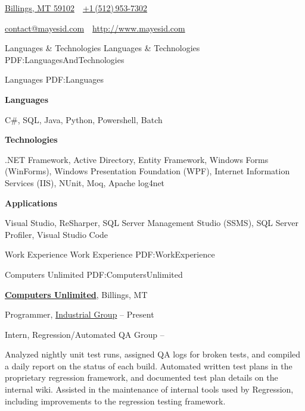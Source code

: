 \documentclass[letterpaper,MMMyyyy,nonstopmode]{simpleresumecv}
\newcommand{\CVAuthor}{Isaac Mayes}
\newcommand{\CVWebpage}{http://www.mayesid.com}
\begin{document}

\Title{\CVAuthor}

\begin{SubTitle}
\href{https://www.google.com/maps/place/Billings,+MT/}
{Billings, MT 59102}
\,\SubBulletSymbol\,
\href{tel:+15129537302}
{+1\,(512)\,953-7302}
\par
\href{mailto:contact@mayesid.com}
{contact@mayesid.com}
\,\SubBulletSymbol\,
\href{\CVWebpage}
{\url{\CVWebpage}}
\end{SubTitle}

\begin{Body}


\Section
{Languages \& \newline Technologies}
{Languages \& Technologies}
{PDF:LanguagesAndTechnologies}

\SubSection
{}
{Languages}
{PDF:Languages}

\Entry
\textbf{Languages}

\Gap
\BulletItem
C\#, SQL, Java, Python, Powershell, Batch

\Entry
\textbf{Technologies}

\Gap
\BulletItem
.NET Framework, Active Directory, Entity Framework, Windows Forms (WinForms), Windows Presentation Foundation (WPF), Internet Information Services (IIS), NUnit, Moq, Apache log4net

\Entry
\textbf{Applications}

\Gap
\BulletItem
Visual Studio, ReSharper, SQL Server Management Studio (SSMS), SQL Server Profiler, Visual Studio Code



\Section
{Work \newline Experience}
{Work Experience}
{PDF:WorkExperience}

\SubSection
{}
{Computers Unlimited}
{PDF:ComputersUnlimited}

\Entry
\href{http://www.cu.net}
{\textbf{Computers Unlimited}},
Billings, MT

\Gap
\BulletItem
Programmer,
\href{http://www.cu.net/industrial}
{Industrial Group}
\hfill
{} --
Present
\begin{Detail}
\end{Detail}

\Gap
\BulletItem
Intern,
Regression/Automated QA Group
\hfill
{} --
\begin{Detail}
\SubBulletItem
Analyzed nightly unit test runs, assigned QA logs for broken tests, and compiled a daily report on the status of each build.
\SubBulletItem
Automated written test plans in the proprietary regression framework, and documented test plan details on the internal wiki.
\SubBulletItem
Assisted in the maintenance of internal tools used by Regression, including improvements to the regression testing framework.
\end{Detail}


\end{Body}
\end{document}
